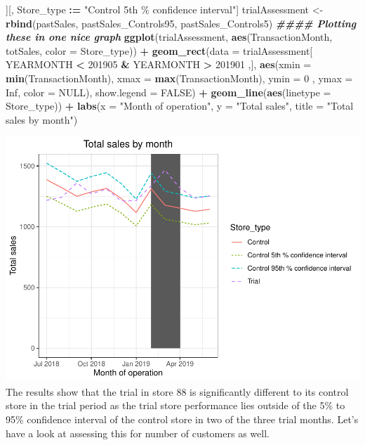 \documentclass[
]{article}
\newenvironment{Shaded}{\begin{snugshade}}{\end{snugshade}}
\newcommand{\AttributeTok}[1]{\textcolor[rgb]{0.13,0.29,0.53}{#1}}
\newcommand{\ConstantTok}[1]{\textcolor[rgb]{0.56,0.35,0.01}{#1}}
\newcommand{\DecValTok}[1]{\textcolor[rgb]{0.00,0.00,0.81}{#1}}
\newcommand{\DocumentationTok}[1]{\textcolor[rgb]{0.56,0.35,0.01}{\textbf{\textit{#1}}}}
\newcommand{\FunctionTok}[1]{\textcolor[rgb]{0.13,0.29,0.53}{\textbf{#1}}}
\newcommand{\NormalTok}[1]{#1}
\newcommand{\OtherTok}[1]{\textcolor[rgb]{0.56,0.35,0.01}{#1}}
\newcommand{\SpecialCharTok}[1]{\textcolor[rgb]{0.81,0.36,0.00}{\textbf{#1}}}
\newcommand{\StringTok}[1]{\textcolor[rgb]{0.31,0.60,0.02}{#1}}
\begin{document}
\begin{Shaded}
\begin{Highlighting}[]
\NormalTok{][, Store\_type }\SpecialCharTok{:=} \StringTok{"Control 5th \% confidence interval"}\NormalTok{]}
\NormalTok{trialAssessment }\OtherTok{\textless{}{-}} \FunctionTok{rbind}\NormalTok{(pastSales, pastSales\_Controls95, pastSales\_Controls5)}
\DocumentationTok{\#\#\#\# Plotting these in one nice graph}
\FunctionTok{ggplot}\NormalTok{(trialAssessment, }\FunctionTok{aes}\NormalTok{(TransactionMonth, totSales, }\AttributeTok{color =}\NormalTok{ Store\_type)) }\SpecialCharTok{+}
\FunctionTok{geom\_rect}\NormalTok{(}\AttributeTok{data =}\NormalTok{ trialAssessment[ YEARMONTH }\SpecialCharTok{\textless{}} \DecValTok{201905} \SpecialCharTok{\&}\NormalTok{ YEARMONTH }\SpecialCharTok{\textgreater{}} \DecValTok{201901}\NormalTok{ ,],}
\FunctionTok{aes}\NormalTok{(}\AttributeTok{xmin =} \FunctionTok{min}\NormalTok{(TransactionMonth), }\AttributeTok{xmax =} \FunctionTok{max}\NormalTok{(TransactionMonth), }\AttributeTok{ymin =} \DecValTok{0}\NormalTok{ ,}
\AttributeTok{ymax =} \ConstantTok{Inf}\NormalTok{, }\AttributeTok{color =} \ConstantTok{NULL}\NormalTok{), }\AttributeTok{show.legend =} \ConstantTok{FALSE}\NormalTok{) }\SpecialCharTok{+} 
  \FunctionTok{geom\_line}\NormalTok{(}\FunctionTok{aes}\NormalTok{(}\AttributeTok{linetype =}\NormalTok{ Store\_type)) }\SpecialCharTok{+} 
  \FunctionTok{labs}\NormalTok{(}\AttributeTok{x =} \StringTok{"Month of operation"}\NormalTok{, }\AttributeTok{y =} \StringTok{"Total sales"}\NormalTok{, }\AttributeTok{title =} \StringTok{"Total sales by month"}\NormalTok{)}
\end{Highlighting}
\end{Shaded}

\includegraphics{InsideSherpa_Task2_files/figure-latex/unnamed-chunk-24-1}
The results show that the trial in store 88 is significantly different
to its control store in the trial period as the trial store performance
lies outside of the 5\% to 95\% confidence interval of the control store
in two of the three trial months. Let's have a look at assessing this
for number of customers as well.
\end{document}

